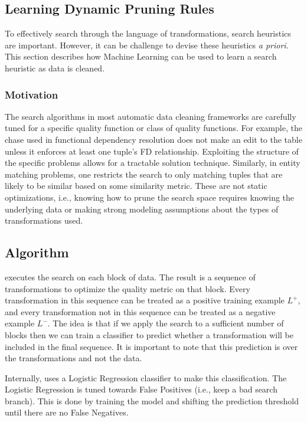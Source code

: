 \subsection{Learning Dynamic Pruning Rules}
To effectively search through the language of transformations, search heuristics are important.
However, it can be challenge to devise these heuristics \emph{a priori}.
This section describes how Machine Learning can be used to learn a search heuristic as data is cleaned.

\subsubsection{Motivation}
The search algorithms in  most automatic data cleaning frameworks are carefully tuned for a specific quality function or class of quality functions. For example, the chase used in functional dependency resolution does not make an edit to the table unless it enforces at least one tuple's FD relationship. Exploiting the structure of the specific problems allows for a tractable solution technique. Similarly, in entity matching problems, one restricts the search to only matching tuples that are likely to be similar based on some similarity metric.
These are not static optimizations, i.e., knowing how to prune the search space requires knowing the underlying data or making strong modeling assumptions about the types of transformations used.

\subsection{Algorithm }
\sys executes the search on each block of data.
The result is a sequence of transformations to optimize the quality metric on that block.
Every transformation in this sequence can be treated as a positive training example $L^+$, and every transformation not in this sequence can be treated as a negative example $L^-$.
The idea is that if we apply the search to a sufficient number of blocks then we can train a classifier to predict whether a transformation will be included in the final sequence.
It is important to note that this prediction is over the transformations and not the data. 

Internally, \sys uses a Logistic Regression classifier to make this classification. The Logistic Regression is tuned towards False Positives (i.e., keep a bad search branch). This is done by training the model and shifting the prediction threshold until there are no False Negatives. 


